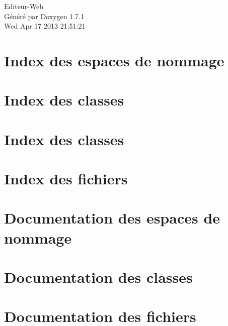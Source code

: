 \documentclass[a4paper]{book}
\begin{document}
\hypersetup{pageanchor=false}
\begin{titlepage}
\vspace*{7cm}
\begin{center}
{\Large Editeur-\/Web }\\
\vspace*{1cm}
{\large Généré par Doxygen 1.7.1}\\
\vspace*{0.5cm}
{\small Wed Apr 17 2013 21:51:21}\\
\end{center}
\end{titlepage}
\clearemptydoublepage
{}
\tableofcontents
\clearemptydoublepage
{}
\hypersetup{pageanchor=true}
\chapter{Index des espaces de nommage}

\chapter{Index des classes}

\chapter{Index des classes}

\chapter{Index des fichiers}

\chapter{Documentation des espaces de nommage}

\chapter{Documentation des classes}









\chapter{Documentation des fichiers}







\printindex
\end{document}
